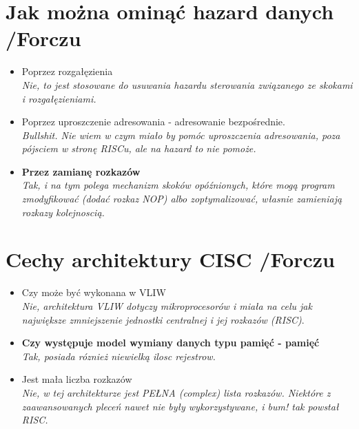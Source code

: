 \documentclass[a4paper,twoside]{article}
\begin{document}
\section{Jak można ominąć hazard danych {\small /Forczu}}
	\begin{itemize}
    \item Poprzez rozgałęzienia\\
    {\small \emph{Nie, to jest stosowane do usuwania hazardu sterowania związanego ze skokami i rozgałęzieniami.}}
    \item Poprzez uproszczenie adresowania - adresowanie bezpośrednie.\\
    {\small \emph{Bullshit. Nie wiem w czym miało by pomóc uproszczenia adresowania, poza pójsciem w stronę RISCu, ale na hazard to nie pomoże.}}
    \item \textbf{Przez zamianę rozkazów}\\
    {\small \emph{Tak, i na tym polega mechanizm skoków opóźnionych, które mogą program zmodyfikować (dodać rozkaz NOP) albo zoptymalizować, własnie zamieniają rozkazy kolejnoscią.}}
    \end{itemize}

\section{Cechy architektury CISC {\small /Forczu}}
	\begin{itemize}
    \item Czy może być wykonana w VLIW\\
    {\small \emph{Nie, architektura VLIW dotyczy mikroprocesorów i miała na celu jak największe zmniejszenie jednostki centralnej i jej rozkazów (RISC)}. }
    \item \textbf{Czy występuje model wymiany danych typu pamięć - pamięć}\\
    {\small \emph{Tak, posiada róznież niewielką ilosc rejestrow.}}
    \item Jest mała liczba rozkazów\\
    {\small \emph{Nie, w tej architekturze jest PEŁNA (complex) lista rozkazów. Niektóre z zaawansowanych pleceń nawet nie były wykorzystywane, i bum! tak powstał RISC.}}
    \end{itemize}
\end{document}
